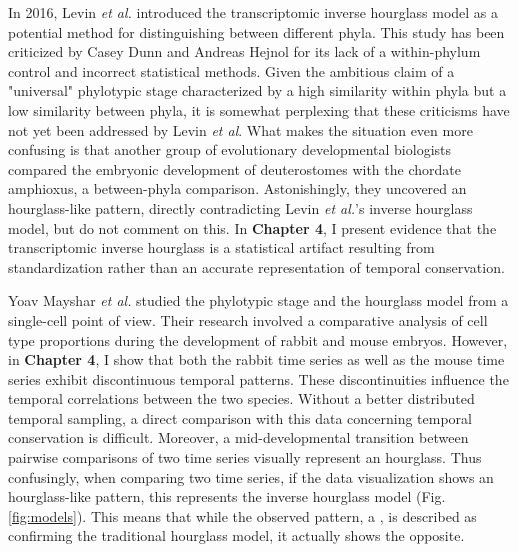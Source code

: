 In 2016, Levin \textit{et al.} introduced the transcriptomic inverse hourglass model as a potential method for distinguishing between different phyla\cite{Levin2016}. This study has been criticized by Casey Dunn and Andreas Hejnol for its lack of a within-phylum control\cite{hejnol2016} and incorrect statistical methods\cite{Dunn2018}. Given the ambitious claim of a "universal" phylotypic stage characterized by a high similarity within phyla but a low similarity between phyla, it is somewhat perplexing that these criticisms have not yet been addressed by Levin \textit{et al}. What makes the situation even more confusing is that another group of evolutionary developmental biologists compared the embryonic development of deuterostomes with the chordate amphioxus, a between-phyla comparison. Astonishingly, they uncovered an hourglass-like pattern\cite{PerezPosada2022}, directly contradicting Levin \textit{et al.}'s inverse hourglass model, but do not comment on this. In \textbf{Chapter 4}, I present evidence that the transcriptomic inverse hourglass is a statistical artifact resulting from standardization rather than an accurate representation of temporal conservation. 

Yoav Mayshar \textit{et al.} studied the phylotypic stage and the hourglass model from a single-cell point of view\cite{Mayshar2023}. Their research involved a comparative analysis of cell type proportions during the development of rabbit and mouse embryos. However, in \textbf{Chapter 4}, I show that both the rabbit time series as well as the mouse time series exhibit discontinuous temporal patterns. These discontinuities influence the temporal correlations between the two species. Without a better distributed temporal sampling, a direct comparison with this data concerning temporal conservation is difficult. Moreover, a mid-developmental transition between pairwise comparisons of two time series visually represent an hourglass. Thus confusingly, when comparing two time series, if the data visualization shows an hourglass-like pattern, this represents the inverse hourglass model (Fig. \ref{fig:models}). This means that while the observed pattern, a , is described as confirming the traditional hourglass model, it actually shows the opposite. 

